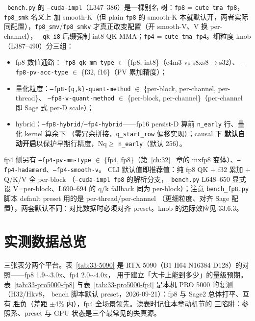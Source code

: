 \texttt{\_bench.py} 的 \texttt{--cuda-impl}（L347--386）是一棵别名
树：\texttt{fp8} = \texttt{cute\_tma\_fp8}，\texttt{fp8\_smk} 名义上
加 smooth-K（但 plain \texttt{fp8} 的 smooth-K 本就默认开，两者实际
同配置），\texttt{fp8\_smv}/\texttt{fp8\_smkv} 才真正改变配置（开
smooth-V、V 换 per-channel），
\texttt{\_qk\_i8} 后缀强制 int8 QK MMA；\texttt{fp4} =
\texttt{cute\_tma\_fp4}。细粒度 knob（L387--490）分三组：
\begin{itemize}[itemsep=0pt,topsep=2pt]
  \item fp8 数值通路：\texttt{--fp8-qk-mm-type} $\in$
        \{fp8, int8\}（e4m3 vs s8xs8$\to$s32）、
        \texttt{--fp8-pv-acc-type} $\in$ \{f32, f16\}（PV 累加精度）；
  \item 量化粒度：\texttt{--fp8-\{q,k\}-quant-method} $\in$
        \{per-block, per-channel, per-thread\}、
        \texttt{--fp8-v-quant-method} $\in$ \{per-block,
        per-channel\}（per-channel 即 Sage 式 per-D scale）；
  \item hybrid：\texttt{--fp8-hybrid}/\texttt{--fp4-hybrid}——fp16
        persist-D 算前 \texttt{n\_early} 行、量化 kernel 算余下
        （零冗余拼接，\texttt{q\_start\_row} 偏移实现）；causal 下
        \textbf{默认自动开启}以保护早期行精度，Nq$\ge$
        \texttt{n\_early}（默认 256）。
\end{itemize}
fp4 侧另有 \texttt{--fp4-pv-mm-type} $\in$ \{fp4, fp8\}（第~\ref{ch:32}~
章的 mxfp8 变体）、\texttt{--fp4-hadamard}、\texttt{--fp4-smooth-v}。
CLI 默认值即推荐值：纯 fp8 QK + f32 累加 + Q/K/V 全 per-block
（\texttt{--cuda-impl fp8} 的解析分支，\texttt{\_bench.py} L648--650
显式设 V=per-block、L690--694 的 q/k fallback 同为 per-block）；注意
\texttt{bench\_fp8.py} 脚本 default preset 用的是 per-thread/per-channel
（更细粒度、对齐 Sage 配置），两套默认不同：对比数据时必须对齐
preset。knob 的边际效应见 33.6.3。

\section{实测数据总览}

三张表分两个平台。表~\ref{tab:33-5090} 是 RTX 5090（B1 H64
N16384 D128）的对照——fp8 1.9$\sim$3.0x、fp4 2.0$\sim$4.0x，
用于建立「大卡上能到多少」的量级预期。表~\ref{tab:33-pro5000-fp8}
与表~\ref{tab:33-pro5000-fp4} 是本机 PRO 5000 的复测（H32/Hkv8，
bench 脚本默认 preset，2026-09-21）：fp8 与 Sage2 总体打平、互有
胜负（差距 $\pm$4\% 内），fp4 全场景领先。读表时记住本章动机节的
三陷阱：参照系、preset 与 GPU 状态是三个最常见的失真源。

